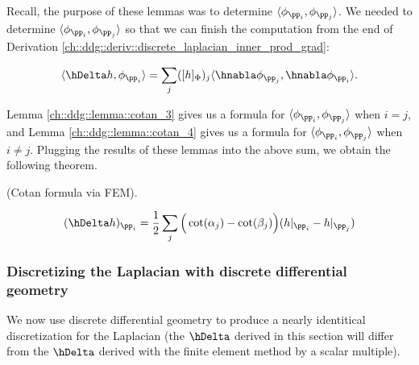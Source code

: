 Recall, the purpose of these lemmas was to determine $\langle \phi_{\pp_i}, \phi_{\pp_j} \rangle$. We needed to determine $\langle \phi_{\pp_i}, \phi_{\pp_j} \rangle$ so that we can finish the computation from the end of Derivation \ref{ch::ddg::deriv::discrete_laplacian_inner_prod_grad}:

\begin{align*}
    \langle \hDelta h, \phi_{\pp_i} \rangle
     = \sum_j ([h]_\Phi)_j \langle \hnabla \phi_{\pp_j}, \hnabla \phi_{\pp_i} \rangle.
\end{align*}

Lemma \ref{ch::ddg::lemma::cotan_3} gives us a formula for $\langle \phi_{\pp_i}, \phi_{\pp_j} \rangle$ when $i = j$, and Lemma \ref{ch::ddg::lemma::cotan_4} gives us a formula for $\langle \phi_{\pp_i}, \phi_{\pp_j} \rangle$ when $i \neq j$. Plugging the results of these lemmas into the above sum, we obtain the following theorem.

\begin{theorem}
    (Cotan formula via FEM).
    
    \begin{align*}
        (\hDelta h)_{\pp_i} = \frac{1}{2} \sum_j \Big( \cot(\alpha_j) - \cot(\beta_j) \Big) (h|_{\pp_i} - h|_{\pp_j})
    \end{align*}
\end{theorem}

\subsubsection*{Discretizing the Laplacian with discrete differential geometry}

We now use discrete differential geometry to produce a nearly identitical discretization for the Laplacian (the $\hDelta$ derived in this section will differ from the $\hDelta$ derived with the finite element method by a scalar multiple).

